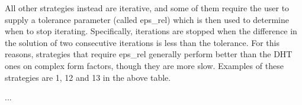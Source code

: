All other strategies instead are iterative, and some of them require the user to supply a tolerance parameter (called {\ttfamily eps\+\_\+rel}) which is then used to determine when to stop iterating. Specifically, iterations are stopped when the difference in the solution of two consecutive iterations is less than the tolerance. For this reasons, strategies that require eps\+\_\+rel generally perform better than the DHT ones on complex form factors, though they are more slow. Examples of these strategies are 1, 12 and 13 in the above table.

... 